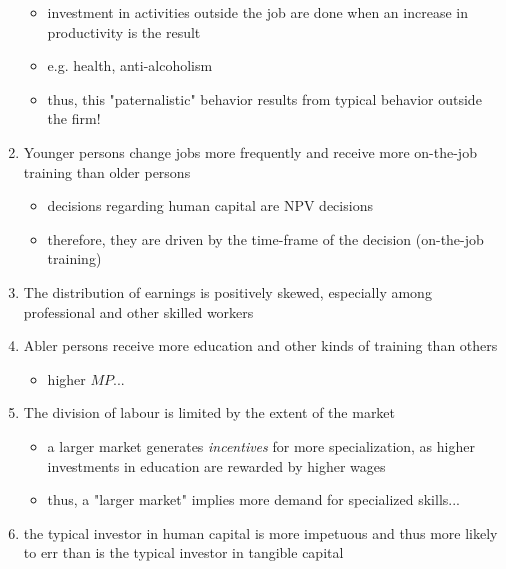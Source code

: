 \documentclass[12pt,a4paper]{article}
\begin{document}
\begin{enumerate}
\begin{itemize}
        \item investment in activities outside the job are done when an
          increase in productivity is the result
        \item e.g. health, anti-alcoholism
        \item thus, this "paternalistic" behavior results from typical
          behavior outside the firm!
      \end{itemize}
    \item Younger persons change jobs more frequently and receive more
      on-the-job training than older persons
      \begin{itemize}
        \item decisions regarding human capital are NPV decisions
        \item therefore, they are driven by the time-frame of the
          decision (on-the-job training)
      \end{itemize}
    \item The distribution of earnings is positively skewed, especially
      among professional and other skilled workers
    \item Abler persons receive more education and other kinds of
      training than others
      \begin{itemize}
        \item higher $MP$...
      \end{itemize}
    \item The division of labour is limited by the extent of the
      market
      \begin{itemize}
        \item a larger market generates \emph{incentives} for more
          specialization, as higher investments in education are
          rewarded by higher wages
        \item thus, a "larger market" implies more demand for
          specialized skills...
      \end{itemize}
    \item the typical investor in human capital is more impetuous and thus
      more likely to err than is the typical investor in tangible capital
  \end{enumerate}
\end{document}
